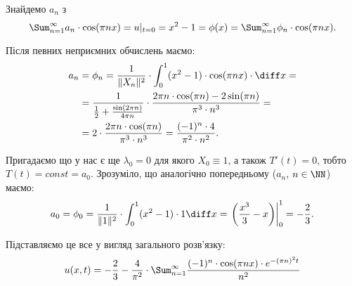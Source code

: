 \begin{solution}
	Знайдемо $a_n$ з
	\begin{equation*}
		\Sum_{n = 1}^\infty a_n \cdot \cos(\pi n x) = u|_{t = 0} = x^2 - 1 = \phi(x) = \Sum_{n = 1}^\infty \phi_n \cdot \cos(\pi n x).
	\end{equation*}

	Після певних неприємних обчислень маємо:
	\begin{align*}
		a_n &= \phi_n = \frac{1}{\|X_n\|^2} \cdot \int_0^1 (x^2 - 1) \cdot \cos(\pi n x) \cdot \diff x = \\ &= \frac{1}{\frac{1}{2} + \frac{\sin(2 \pi n)}{4 \pi n}} \cdot \frac{2 \pi n \cdot \cos(\pi n) - 2 \sin(\pi n)}{\pi^3 \cdot n^3} = \\ &= 2 \cdot \frac{2 \pi n \cdot \cos(\pi n)}{\pi^3 \cdot n^3} = \frac{(-1)^n \cdot 4}{\pi^2 \cdot n^2}.
	\end{align*}

	Пригадаємо що у нас є ще $\lambda_0 = 0$ для якого $X_0 \equiv 1$, а також $T'(t) = 0$, тобто $T(t) = const = a_0$. Зрозуміло, що аналогічно попередньому ($a_n$, $n \in \NN$) маємо:
	\begin{equation*}
		a_0 = \phi_0 = \frac{1}{\|1\|^2} \cdot \int_0^1 (x^2 - 1) \cdot 1 \diff x = \left. \left( \frac{x^3}{3} - x \right) \right|_0^1 = - \frac{2}{3}.
	\end{equation*}

	Підставляємо це все у вигляд загального розв'язку:
	\begin{equation*}
		u(x, t) = -\frac{2}{3} - \frac{4}{\pi^2} \cdot \Sum_{n = 1}^\infty \frac{(-1)^n \cdot \cos(\pi n x) \cdot e^{ - (\pi n)^2 t}}{n^2}
	\end{equation*}
\end{solution}


